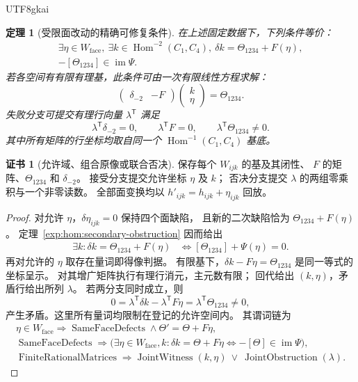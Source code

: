\documentclass[12pt,a4paper,openany,notitlepage]{report}
\theoremstyle{plain}
\newtheorem{theorem}{定理}[chapter]
\theoremstyle{definition}
\newtheorem*{certificate}{证书}
\theoremstyle{remark}
\begin{document}
\begin{CJK*}{UTF8}{gkai}
\begin{theorem}[受限面改动的精确可修复条件]
\label{exp:hom:restricted-secondary}
在上述固定数据下，下列条件等价：
\[
 \begin{gathered}
 \exists\eta\in W_{\mathrm{face}},\
 \exists k\in\operatorname{Hom}^{-2}(C_1,C_4),\
 \delta k=\Theta_{1234}+F(\eta),\\
 -[\Theta_{1234}]\in\operatorname{im}\Psi.
 \end{gathered}
\]
若各空间有有限有理基，此条件可由一次有限线性方程求解：
\[
 \begin{pmatrix}\delta_{-2}&-F\end{pmatrix}
 \begin{pmatrix}k\\ \eta\end{pmatrix}
 =\Theta_{1234}.
\]
失败分支可提交有理行向量 $\lambda^{\mathsf T}$ 满足
\[
 \lambda^{\mathsf T}\delta_{-2}=0,\qquad
 \lambda^{\mathsf T}F=0,\qquad
 \lambda^{\mathsf T}\Theta_{1234}\ne0.
\]
其中所有矩阵的行坐标均取自同一个
$\operatorname{Hom}^{-1}(C_1,C_4)$ 基底。
\end{theorem}
\begin{certificate}[允许域、组合原像或联合否决]
保存每个 $W_{ijk}$ 的基及其闭性、
$F$ 的矩阵、$\Theta_{1234}$ 和 $\delta_{-2}$。
接受分支提交允许坐标 $\eta$ 及 $k$；
否决分支提交 $\lambda$ 的两组零乘积与一个非零读数。
全部面变换均以 $h'_{ijk}=h_{ijk}+\eta_{ijk}$ 回放。
\end{certificate}
\begin{proof}
对允许 $\eta$，$\delta\eta_{ijk}=0$ 保持四个面缺陷，
且新的二次缺陷恰为 $\Theta_{1234}+F(\eta)$。
定理~\ref{exp:hom:secondary-obstruction} 因而给出
\[
 \begin{aligned}
 \exists k:\delta k=\Theta_{1234}+F(\eta)
 &\Longleftrightarrow
 [\Theta_{1234}]+\Psi(\eta)=0.
 \end{aligned}
\]
再对允许的 $\eta$ 取存在量词即得像判据。
有限基下，$\delta k-F\eta=\Theta_{1234}$ 是同一等式的坐标呈示。
对其增广矩阵执行有理行消元，主元数有限；
回代给出 $(k,\eta)$，矛盾行给出所列 $\lambda$。
若两分支同时成立，则
\[
 0=\lambda^{\mathsf T}\delta k-\lambda^{\mathsf T}F\eta
   =\lambda^{\mathsf T}\Theta_{1234}\ne0,
\]
产生矛盾。这里所有量词均限制在登记的允许空间内。
其谓词链为
\[
 \begin{gathered}
 \eta\in W_{\mathrm{face}}
 \Rightarrow\operatorname{SameFaceDefects}
 \land\Theta'=\Theta+F\eta,\\
 \operatorname{SameFaceDefects}
 \Rightarrow
 \bigl(\exists\eta\in W_{\mathrm{face}},k:\delta k=\Theta+F\eta
 \Longleftrightarrow-[\Theta]\in\operatorname{im}\Psi\bigr),\\
 \operatorname{FiniteRationalMatrices}
 \Rightarrow
 \operatorname{JointWitness}(k,\eta)
 \ \vee\ \operatorname{JointObstruction}(\lambda).
 \end{gathered}
\]
\end{proof}



\end{CJK*}
\end{document}
